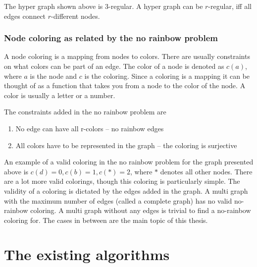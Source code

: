 \documentclass{article}
\begin{document}
The hyper graph shown above is $3$-regular.
A hyper graph can be $r$-regular, iff all edges connect $r$-different nodes.

\subsubsection{Node coloring as related by the no rainbow problem}
A node coloring is a mapping from nodes to colors.
There are usually constraints on what colors can be part of an edge.
The color of a node is denoted as $c(a)$, where $a$ is the node and $c$ is the coloring.
Since a coloring is a mapping it can be thought of as a function that takes you from a node to the color of the node.
A color is usually a letter or a number.

The constraints added in the no rainbow problem are
\begin{enumerate}
  \item No edge can have all r-colors -- no rainbow edges
  \item All colors have to be represented in the graph -- the coloring is surjective
\end{enumerate}

An example of a valid coloring in the no rainbow problem for the graph presented above is $c(d)=0, c(b)=1, c(*)=2$, where $*$ denotes all other nodes.
There are a lot more valid colorings, though this coloring is particularly simple.
The validity of a coloring is dictated by the edges added in the graph.
A multi graph with the maximum number of edges (called a complete graph) has no valid no-rainbow coloring.
A multi graph without any edges is trivial to find a no-rainbow coloring for.
The cases in between are the main topic of this thesis.




\section{The existing algorithms}

\printbibliography
\end{document}
